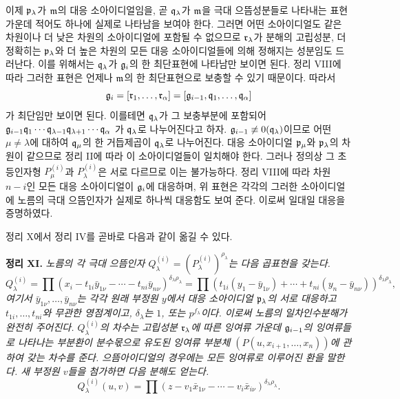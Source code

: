 이제 \(\mathfrak p_\lambda\)가 \(\mathfrak m\)의 대응 소아이디얼임을, 곧 \(\mathfrak q_\lambda\)가 \(\mathfrak m\)을 극대 으뜸성분들로 나타내는 표현 가운데 적어도 하나에 실제로 나타남을 보여야 한다. 그러면 어떤 소아이디얼도 같은 차원이나 더 낮은 차원의 소아이디얼에 포함될 수 없으므로 \(\mathfrak r_\lambda\)가 분해의 고립성분, 더 정확히는 \(\mathfrak p_\lambda\)와 더 높은 차원의 모든 대응 소아이디얼들에 의해 정해지는 성분임도 드러난다. 이를 위해서는 \(\mathfrak q_\lambda\)가 \(\mathfrak g_i\)의 한 최단표현에 나타남만 보이면 된다. 정리 VIII에 따라 그러한 표현은 언제나 \(\mathfrak m\)의 한 최단표현으로 보충할 수 있기 때문이다. 따라서
\[
 \mathfrak g_i=[\mathfrak r_1,\ldots,\mathfrak r_\alpha]
          =[\mathfrak g_{i-1},\mathfrak q_1,\ldots,\mathfrak q_\alpha]
\]
가 최단임만 보이면 된다. 이를테면 \(\mathfrak q_\lambda\)가 그 보충부분에 포함되어
\(
\mathfrak g_{i-1}\mathfrak q_1\cdots\mathfrak q_{\lambda-1}
\mathfrak q_{\lambda+1}\cdots\mathfrak q_\alpha
\)
가 \(\mathfrak q_\lambda\)로 나누어진다고 하자. \(\mathfrak g_{i-1}\not\equiv0(\mathfrak q_\lambda)\)이므로 어떤 \(\mu\ne\lambda\)에 대하여 \(\mathfrak q_\mu\)의 한 거듭제곱이 \(\mathfrak q_\lambda\)로 나누어진다. 대응 소아이디얼 \(\mathfrak p_\mu\)와 \(\mathfrak p_\lambda\)의 차원이 같으므로 정리 II에 따라 이 소아이디얼들이 일치해야 한다. 그러나 정의상 그 초등인자형 \(P_\mu^{(i)}\)과 \(P_\lambda^{(i)}\)은 서로 다르므로 이는 불가능하다. 정리 VIII에 따라 차원 \(n-i\)인 모든 대응 소아이디얼이 \(\mathfrak g_i\)에 대응하며, 위 표현은 각각의 그러한 소아이디얼에 노름의 극대 으뜸인자가 실제로 하나씩 대응함도 보여 준다. 이로써 일대일 대응을 증명하였다.

정리 X에서 정리 IV를 곧바로 다음과 같이 옮길 수 있다.

\textbf{정리 XI.} \emph{노름의 각 극대 으뜸인자 \(Q_\lambda^{(i)}=(P_\lambda^{(i)})^{\rho_\lambda}\)는 다음 곱표현을 갖는다.}
\[
 Q_\lambda^{(i)}
 =\prod (x_i-t_{1i}\bar y_{1\nu}-\cdots-t_{ni}\bar y_{n\nu})^{\delta_\lambda\rho_\lambda}
 =\prod (t_{1i}(y_1-\bar y_{1\nu})+\cdots+t_{ni}(y_n-\bar y_{n\nu}))^{\delta_\lambda\rho_\lambda},
\]
\emph{여기서 \(\bar y_{1\nu},\ldots,\bar y_{n\nu}\)는 각각 원래 부정원 \(y\)에서 대응 소아이디얼 \(\mathfrak p_\lambda\)의 서로 대응하고 \(t_{1i},\ldots,t_{ni}\)와 무관한 영점계이고, \(\delta_\lambda\)는 \(1\), 또는 \(p^{f_\lambda}\)이다. 이로써 노름의 일차인수분해가 완전히 주어진다. \(Q_\lambda^{(i)}\)의 차수는 고립성분 \(\mathfrak r_\lambda\)에 따른 잉여류 가운데 \(\mathfrak g_{i-1}\)의 잉여류들로 나타나는 부분환이 분수몫으로 유도된 잉여류 부분체 \((P(u,x_{i+1},\ldots,x_n))\)에 관하여 갖는 차수를 준다. 으뜸아이디얼의 경우에는 모든 잉여류로 이루어진 환을 말한다. 새 부정원 \(v\)들을 첨가하면 다음 분해도 얻는다.}
\[
 Q_\lambda^{(i)}(u,v)
 =\prod (z-v_1\bar x_{1\nu}-\cdots-v_i\bar x_{i\nu})^{\delta_\lambda\rho_\lambda}.
\]

